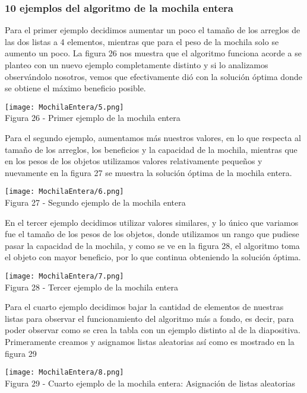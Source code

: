 \documentclass[12pt,twoside]{article}
\begin{document}
\subsubsection{10 ejemplos del algoritmo de la mochila entera}
Para el primer ejemplo decidimos aumentar un poco el tamaño de los arreglos de las dos listas a 4 elementos, mientras que para el peso de la mochila solo se aumento un poco. La figura 26 nos muestra que el algoritmo funciona acorde a se planteo con un nuevo ejemplo completamente distinto y si lo analizamos observándolo nosotros, vemos que efectivamente dió con la solución óptima donde se obtiene el máximo beneficio posible.
\begin{center}
    \texttt{[image: MochilaEntera/5.png]}\\
    Figura 26 - Primer ejemplo de la mochila entera
\end{center}
Para el segundo ejemplo, aumentamos más nuestros valores, en lo que respecta al tamaño de los arreglos, los beneficios y la capacidad de la mochila, mientras que en los pesos de los objetos utilizamos valores relativamente pequeños y nuevamente en la figura 27 se muestra la solución óptima de la mochila entera.
\begin{center}
    \texttt{[image: MochilaEntera/6.png]}\\
    Figura 27 - Segundo ejemplo de la mochila entera
\end{center}
En el tercer ejemplo decidimos utilizar valores similares, y lo único que variamos fue el tamaño de los pesos de los objetos, donde utilizamos un rango que pudiese pasar la capacidad de la mochila, y como se ve en la figura 28, el algoritmo toma el objeto con mayor beneficio, por lo que continua obteniendo la solución óptima.
\begin{center}
    \texttt{[image: MochilaEntera/7.png]}\\
    Figura 28 - Tercer ejemplo de la mochila entera
\end{center}
Para el cuarto ejemplo decidimos bajar la cantidad de elementos de nuestras listas para observar el funcionamiento del algoritmo más a fondo, es decir, para poder observar como se crea la tabla con un ejemplo distinto al de la diapositiva. Primeramente creamos y asignamos listas aleatorias así como es mostrado en la figura 29
\begin{center}
    \texttt{[image: MochilaEntera/8.png]}\\
    Figura 29 - Cuarto ejemplo de la mochila entera: Asignación de listas aleatorias
\end{center}
\end{document}
